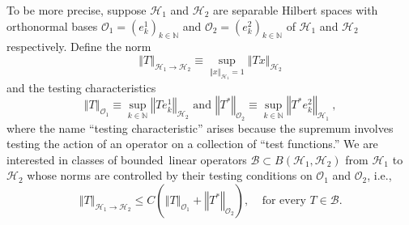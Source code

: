 \documentclass{amsart}%
\theoremstyle{plain}
\numberwithin{equation}{section}
\begin{document}
To be more precise, suppose $\mathcal{H}_{1}$ and $\mathcal{H}_{2}$ are separable Hilbert spaces
with orthonormal bases $\mathcal{O}_{1}=\left(  e_{k}^{1}\right)
_{k\in\mathbb{N}}$ and $\mathcal{O}_{2}=\left(  e_{k}^{2}\right)
_{k\in\mathbb{N}}$ of $\mathcal{H}_{1}$ and $\mathcal{H}_{2}$ respectively.
Define the norm
\[
\left\Vert T\right\Vert _{\mathcal{H}_{1}\rightarrow\mathcal{H}_{2}}\equiv
\sup_{\left\Vert x\right\Vert _{\mathcal{H}_{1}}=1}\left\Vert Tx\right\Vert
_{\mathcal{H}_{2}}
\]
and the testing characteristics
\[
	\left\Vert T\right\Vert _{\mathcal{O}_{1}}%
\equiv\sup_{k\in\mathbb{N}}\left\Vert Te_{k}^{1}\right\Vert _{\mathcal{H}_{2}%
}\text{ and }\left\Vert T^{\ast}\right\Vert _{\mathcal{O}_{2}}\equiv\sup
_{k\in\mathbb{N}}\left\Vert T^{\ast}e_{k}^{2}\right\Vert _{\mathcal{H}_{1}%
}\ ,
\]
where the name ``testing
characteristic'' arises because the supremum involves testing the action of an 
operator on a collection of ``test functions.'' We are interested in classes of bounded\ linear operators $\mathcal{B}%
\subset B\left(  \mathcal{H}_{1},\mathcal{H}_{2}\right)  $ from $\mathcal{H}%
_{1}$ to $\mathcal{H}_{2}$ whose norms are controlled by their testing conditions on $\mathcal{O}_1$ and $\mathcal{O}_2$, i.e., 
\begin{equation}
\left\Vert T\right\Vert _{\mathcal{H}_{1}\rightarrow\mathcal{H}_{2}}\leq
C\left(  \left\Vert T\right\Vert _{\mathcal{O}_{1}}+\left\Vert T^{\ast
}\right\Vert _{\mathcal{O}_{2}}\right)  ,\ \ \ \ \ \text{for every }%
T\in\mathcal{B}. \label{controlled}%
\end{equation}
\end{document}
